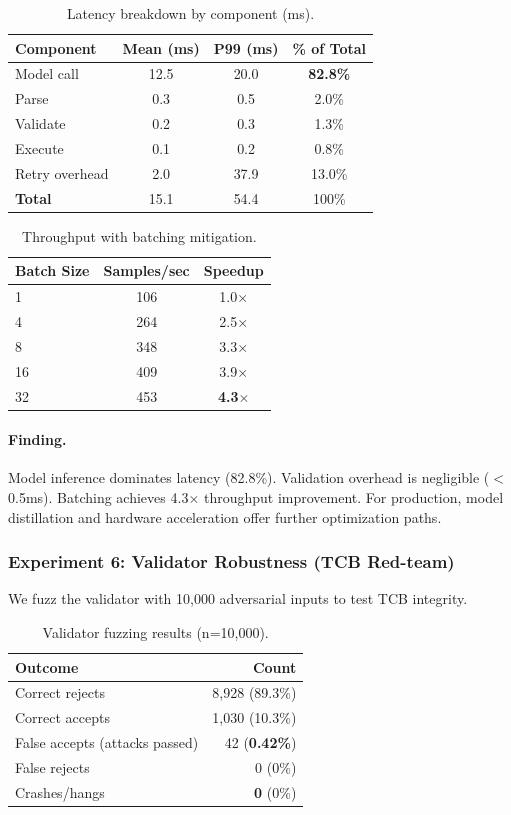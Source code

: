 \documentclass[11pt]{article}
\begin{document}
\begin{table}[h]
\centering
\caption{Latency breakdown by component (ms).}
\label{tab:exp5_latency}
\begin{tabular}{lccc}
\toprule
Component & Mean (ms) & P99 (ms) & \% of Total \\
\midrule
Model call & 12.5 & 20.0 & \textbf{82.8\%} \\
Parse & 0.3 & 0.5 & 2.0\% \\
Validate & 0.2 & 0.3 & 1.3\% \\
Execute & 0.1 & 0.2 & 0.8\% \\
Retry overhead & 2.0 & 37.9 & 13.0\% \\
\midrule
\textbf{Total} & 15.1 & 54.4 & 100\% \\
\bottomrule
\end{tabular}
\end{table}

\begin{table}[h]
\centering
\caption{Throughput with batching mitigation.}
\label{tab:exp5_batching}
\begin{tabular}{lcc}
\toprule
Batch Size & Samples/sec & Speedup \\
\midrule
1 & 106 & 1.0$\times$ \\
4 & 264 & 2.5$\times$ \\
8 & 348 & 3.3$\times$ \\
16 & 409 & 3.9$\times$ \\
32 & 453 & \textbf{4.3$\times$} \\
\bottomrule
\end{tabular}
\end{table}

\paragraph{Finding.} Model inference dominates latency (82.8\%). Validation overhead is negligible ($<$0.5ms). Batching achieves 4.3$\times$ throughput improvement. For production, model distillation and hardware acceleration offer further optimization paths.

\subsubsection{Experiment 6: Validator Robustness (TCB Red-team)}

We fuzz the validator with 10,000 adversarial inputs to test TCB integrity.

\begin{table}[h]
\centering
\caption{Validator fuzzing results (n=10,000).}
\label{tab:exp6_fuzz}
\begin{tabular}{lr}
\toprule
Outcome & Count \\
\midrule
Correct rejects & 8,928 (89.3\%) \\
Correct accepts & 1,030 (10.3\%) \\
False accepts (attacks passed) & 42 (\textbf{0.42\%}) \\
False rejects & 0 (0\%) \\
Crashes/hangs & \textbf{0} (0\%) \\
\bottomrule
\end{tabular}
\end{table}
\end{document}
